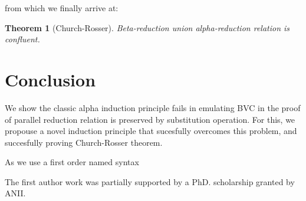 \documentclass[preprint,10pt]{sigplanconf}
\newtheorem{theo}{Theorem}
\begin{document}
\noindent from which we finally arrive at:

\begin{theo}[Church-Rosser]
Beta-reduction union alpha-reduction relation is confluent.
\end{theo}



\section{Conclusion}

We show the classic alpha induction principle fails in emulating BVC in the proof of parallel reduction relation is preserved by substitution operation. For this, we propouse a novel induction principle that sucesfully overcomes this problem, and succesfully proving Church-Rosser theorem.

As we use a first order named syntax 




\acks

The first author work was partially supported by a PhD. scholarship granted by ANII.









\end{document}
